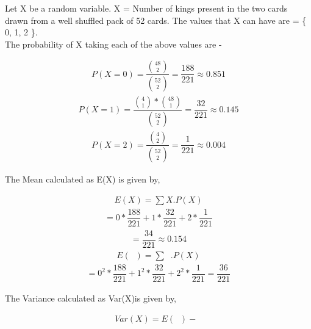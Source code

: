 \documentclass[journal,12pt,twocolumn]{IEEEtran}
\begin{document}
\subsection*{}\\
\begin{flushleft}Let X be a random variable.\newline
X = Number of kings present in the two cards drawn from a well shuffled pack of 52 cards.\newline
\newline The values that X can have are = \Big\{ 0, 1, 2 \Big\}.\\
\newline The probability of X taking each of the above values are - \end{flushleft}
\begin{align}P(X=0) = \dfrac{\binom{48}{2}}{\binom{52}{2}} = \dfrac{188}{221} \approx 0.851\end{align}
\begin{align}P(X=1) = \dfrac{\binom{4}{1} * \binom{48}{1}}{\binom{52}{2}} = \dfrac{32}{221} \approx 0.145\end{align}
\begin{align}P(X=2) = \dfrac{\binom{4}{2}}{\binom{52}{2}} = \dfrac{1}{221} \approx 0.004\end{align}
\newline
\begin{flushleft}The Mean calculated as E(X) is given by,\end{flushleft}
\begin{align}E(X) = \sum X.P(X) \end{align}
\begin{align*}= 0*\dfrac{188}{221} + 1*\dfrac{32}{221} + 2*\dfrac{1}{221}\end{align*}
\begin{align*}= \dfrac{34}{221} \approx 0.154\end{align*}
\begin{align*}E(\mathop{X^2}) = \sum \mathop{X^2}.P(X)\end{align*}
\begin{align*}= 0^2 * \dfrac{188}{221} + 1^2 * \dfrac{32}{221} + 2^2 * \dfrac{1}{221} = \dfrac{36}{221}\end{align*}
\newline
\begin{flushleft}The Variance calculated as Var(X)is given by,\end{flushleft}
\begin{align}Var(X) = E(\mathop{X^2}) - \mathop{[E(X)]^2}\end{align}
\end{document}
